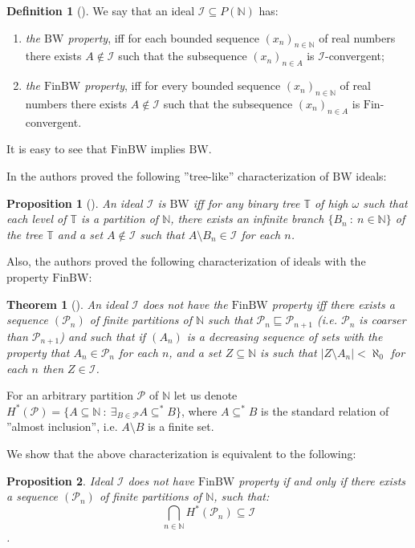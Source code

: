 \documentclass{amsart}
\newtheorem{thm}{Theorem}
\newtheorem{prop}{Proposition}
\theoremstyle{definition}
\newtheorem{df}{Definition}
\theoremstyle{definition}
\newcommand{\N}{{\mathbb N}}
\newcommand{\Fin}{\textrm{Fin}}
\newcommand{\I}{\mathcal I}
\newcommand{\bw}{\text{BW}}
\newcommand{\finbw}{\text{FinBW}}
\DeclareMathOperator{\Exists}{\exists}
\begin{document}
\begin{df}[\cite{H1}]
We say that an ideal $\I \subseteq P(\N)$ has:
\begin{enumerate}
\item \emph{the $\bw$ property}, 
iff for each bounded sequence $(x_n)_{n\in\N}$ 
of real numbers there exists $A\notin\I$ 
such that the subsequence $(x_n)_{n\in A}$ is $\I$-convergent;
\item \emph{the $\finbw$ property}, iff for every bounded sequence
$(x_n)_{n\in\N}$ of real numbers there exists $A\notin\I$ 
such that the subsequence $(x_n)_{n\in A}$ is $\Fin$-convergent.
\end{enumerate}
\end{df}
It is easy to see that $\finbw$ implies $\bw$.

In \cite{H1} the authors proved the following ''tree-like'' 
characterization of $\bw$ ideals:
\begin{prop}[\cite{H1}]
An ideal $\I$ is $\bw$ iff for any binary tree $\mathbb{T}$ of high $\omega$ 
such that each level of $\mathbb{T}$ is a partition of $\N$, 
there exists an infinite branch $\{B_n \ :\ n\in \N\}$ of the tree
$\mathbb{T}$ and a set $A\notin\I$ such that $A\setminus B_n \in\I$ for each $n$.
\end{prop}

Also, the authors \cite{BFMS11} proved 
the following characterization of ideals with the property $\finbw$:
\begin{thm}[\cite{BFMS11}]
\label{tree-fin-bw}
An ideal $\I$ does not have the $\finbw$ property iff there exists a 
sequence $(\mathcal{P}_n)$ of finite partitions of $\N$ such that 
$\mathcal{P}_n \sqsubseteq \mathcal{P}_{n + 1}$
(i.e. $\mathcal{P}_n$ is coarser than $\mathcal{P}_{n + 1}$)
and such that if $(A_n)$ is a decreasing sequence 
of sets with the property that $A_n \in \mathcal{P}_n$ for each $n$, 
and a set $Z\subseteq\N$ is such that $|Z\setminus A_n| < \aleph_0$ 
for each $n$ then $Z\in\I$.
\end{thm}

For an arbitrary partition $\mathcal{P}$ of $\N$ 
let us denote \\$H^{*}(\mathcal{P}) = \{A\subseteq\N\ :\ \Exists_{B\in\mathcal{P}} A\subseteq^{*} B\}$, 
where $A\subseteq^{*} B$ is the standard relation of ''almost inclusion'', i.e. 
$A\setminus B$ is a finite set.

We show that the above characterization is equivalent to the following:

\begin{prop}
Ideal $\I$ does not have $\finbw$ property if and only if there exists a sequence $(\mathcal{P}_n)$ of finite partitions of $\N$, such that: 
$$\bigcap_{n\in\N} H^{*}(\mathcal{P}_n)\subseteq\I$$.
\end{prop}
\end{document}
